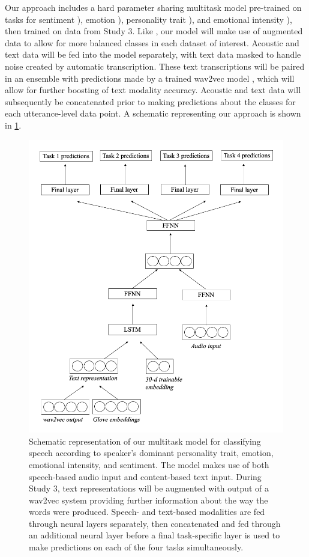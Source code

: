 \documentclass[11pt]{article}
\begin{document}
Our approach includes a hard parameter sharing multitask model pre-trained on
tasks for sentiment \citep{Zadeh.ea:2016}), emotion \citep{Poria.ea:2019}),
personality trait \citep{Ponce-Lopez.ea:2016}),
and emotional intensity \citep{Livingstone.ea:2018}), then trained on data from
Study 3. Like \citet{Liu.ea:2021}, our model will make use of augmented data to
allow for more balanced classes in each dataset of interest.  Acoustic and text
data will be fed into the model separately, with text data masked to handle
noise created by automatic transcription. These text transcriptions will be
paired in an ensemble with predictions made by a trained wav2vec model
\citep{Schneider.ea:2019}, which will allow for further boosting of text
modality accuracy. Acoustic and text data will subsequently be concatenated
prior to making predictions about the classes for each utterance-level data
point. A schematic representing our approach is shown in
\ref{fig:sentiment_model_schematics}.

\begin{figure}
    \includegraphics[width=\textwidth]{images/sentiment-schematics-study3.png}
    \caption{Schematic representation of our multitask model
    for classifying speech according to speaker's dominant personality trait,
    emotion, emotional intensity, and sentiment. The model makes use of both
    speech-based audio input and content-based text input. During Study 3,
    text representations will be augmented with output of a wav2vec system
    providing further information about the way the words were produced.
    Speech- and text-based modalities are fed through neural layers separately,
    then concatenated and fed through an additional neural layer before a final
    task-specific layer is used to make predictions on each of the four tasks
    simultaneously.}
    \label{fig:sentiment_model_schematics}
\end{figure}
\end{document}

